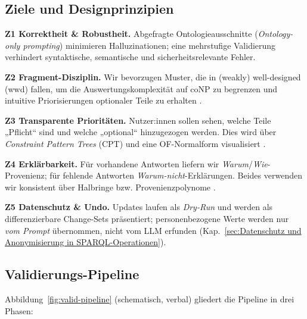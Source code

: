 \subsection{Ziele und Designprinzipien}
\label{sec:valid-ziele}

\textbf{Z1 Korrektheit \& Robustheit.} Abgefragte Ontologieausschnitte (\emph{Ontology-only prompting}) minimieren Halluzinationen; eine mehrstufige Validierung verhindert syntaktische, semantische und sicherheitsrelevante Fehler.

\textbf{Z2 Fragment-Disziplin.} Wir bevorzugen Muster, die in (weakly) well-designed (wwd) fallen, um die Auswertungskomplexität auf coNP zu begrenzen und intuitive Priorisierungen optionaler Teile zu erhalten \cite{perez2009sparql,kaminski2016beyond}.

\textbf{Z3 Transparente Prioritäten.} Nutzer:innen sollen sehen, welche Teile „Pflicht“ sind und welche „optional“ hinzugezogen werden. Dies wird über \emph{Constraint Pattern Trees} (CPT) und eine OF-Normalform visualisiert \cite{kaminski2016beyond}.

\textbf{Z4 Erklärbarkeit.} Für vorhandene Antworten liefern wir \emph{Warum}/\emph{Wie}-Provenienz; für fehlende Antworten \emph{Warum-nicht}-Erklärungen. Beides verwenden wir konsistent über Halbringe bzw. Provenienzpolynome \cite{green2007provenance,herschel2017survey}.

\textbf{Z5 Datenschutz \& Undo.} Updates laufen als \emph{Dry-Run} und werden als differenzierbare Change-Sets präsentiert; personenbezogene Werte werden nur \emph{vom Prompt} übernommen, nicht vom LLM erfunden (Kap.~\ref{sec:Datenschutz und Anonymisierung in SPARQL-Operationen}).


\subsection{Validierungs-Pipeline}
\label{sec:valid-pipeline}

Abbildung~\ref{fig:valid-pipeline} (schematisch, verbal) gliedert die Pipeline in drei Phasen:


